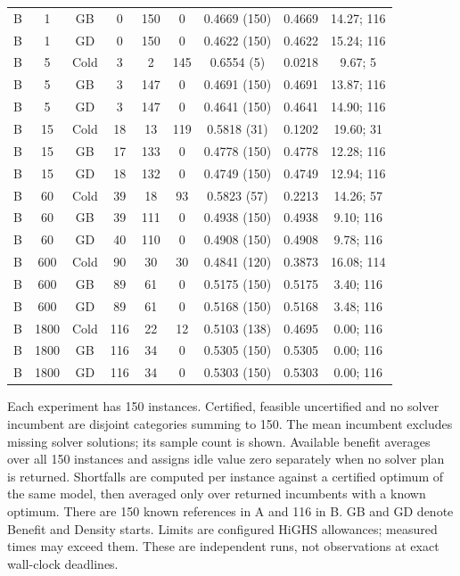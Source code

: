 \begin{table}[!htbp]
\begin{tabular}{@{}ccccccccc@{}}
B & 1 & GB & 0 & 150 & 0 & 0.4669 (150) & 0.4669 & 14.27; 116 \\
B & 1 & GD & 0 & 150 & 0 & 0.4622 (150) & 0.4622 & 15.24; 116 \\
B & 5 & Cold & 3 & 2 & 145 & 0.6554 (5) & 0.0218 & 9.67; 5 \\
B & 5 & GB & 3 & 147 & 0 & 0.4691 (150) & 0.4691 & 13.87; 116 \\
B & 5 & GD & 3 & 147 & 0 & 0.4641 (150) & 0.4641 & 14.90; 116 \\
B & 15 & Cold & 18 & 13 & 119 & 0.5818 (31) & 0.1202 & 19.60; 31 \\
B & 15 & GB & 17 & 133 & 0 & 0.4778 (150) & 0.4778 & 12.28; 116 \\
B & 15 & GD & 18 & 132 & 0 & 0.4749 (150) & 0.4749 & 12.94; 116 \\
B & 60 & Cold & 39 & 18 & 93 & 0.5823 (57) & 0.2213 & 14.26; 57 \\
B & 60 & GB & 39 & 111 & 0 & 0.4938 (150) & 0.4938 & 9.10; 116 \\
B & 60 & GD & 40 & 110 & 0 & 0.4908 (150) & 0.4908 & 9.78; 116 \\
B & 600 & Cold & 90 & 30 & 30 & 0.4841 (120) & 0.3873 & 16.08; 114 \\
B & 600 & GB & 89 & 61 & 0 & 0.5175 (150) & 0.5175 & 3.40; 116 \\
B & 600 & GD & 89 & 61 & 0 & 0.5168 (150) & 0.5168 & 3.48; 116 \\
B & 1800 & Cold & 116 & 22 & 12 & 0.5103 (138) & 0.4695 & 0.00; 116 \\
B & 1800 & GB & 116 & 34 & 0 & 0.5305 (150) & 0.5305 & 0.00; 116 \\
B & 1800 & GD & 116 & 34 & 0 & 0.5303 (150) & 0.5303 & 0.00; 116 \\
\bottomrule
\end{tabular}
\begin{minipage}{0.98\textwidth}
\footnotesize
Each experiment has 150 instances. Certified, feasible uncertified and no solver incumbent are disjoint categories summing to 150. The mean incumbent excludes missing solver solutions; its sample count is shown. Available benefit averages over all 150 instances and assigns idle value zero separately when no solver plan is returned. Shortfalls are computed per instance against a certified optimum of the same model, then averaged only over returned incumbents with a known optimum. There are 150 known references in A and 116 in B. GB and GD denote Benefit and Density starts. Limits are configured HiGHS allowances; measured times may exceed them. These are independent runs, not observations at exact wall-clock deadlines.
\end{minipage}
\end{table}
